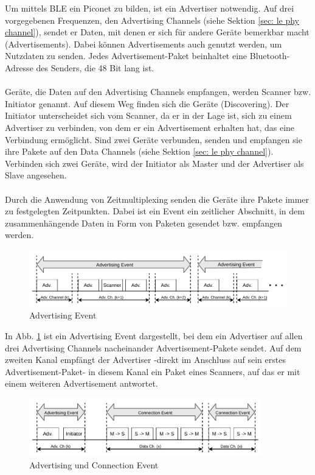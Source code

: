 Um mittels BLE ein Piconet zu bilden, ist ein Advertiser notwendig. Auf drei vorgegebenen Frequenzen, den Advertising Channels (siehe Sektion \ref{sec: le phy channel}), sendet er Daten, mit denen er sich für andere Geräte bemerkbar macht (Advertisements). Dabei können Advertisements auch genutzt werden, um Nutzdaten zu senden. Jedes Advertisement-Paket beinhaltet eine Bluetooth-Adresse des Senders, die 48 Bit lang ist.
\\\\
Geräte, die Daten auf den Advertising Channels empfangen, werden Scanner bzw. Initiator genannt. Auf diesem Weg finden sich die Geräte (Discovering). Der Initiator unterscheidet sich vom Scanner, da er in der Lage ist, sich zu einem Advertiser zu verbinden, von dem er ein Advertisement erhalten hat, das eine Verbindung ermöglicht. Sind zwei Geräte verbunden, senden und empfangen sie ihre Pakete auf den Data Channels (siehe Sektion \ref{sec: le phy channel}). Verbinden sich zwei Geräte, wird der Initiator als Master und der Advertiser als Slave angesehen.
\\\\
Durch die Anwendung von Zeitmultiplexing senden die Geräte ihre Pakete immer zu festgelegten Zeitpunkten. Dabei ist ein Event ein zeitlicher Abschnitt, in dem zusammenhängende Daten in Form von Paketen gesendet bzw. empfangen werden.

\begin{figure}[H]
    \centering
    \includegraphics[width=\textwidth]{graphics/advertising_event.pdf}
    \caption[Advertising Event]{Advertising Event \cite{BtSpec4.0_127}}
    \label{fig: adv event}
\end{figure}

In Abb. \ref{fig: adv event} ist ein Advertising Event dargestellt, bei dem ein Advertiser auf allen drei Advertising Channels nacheinander Advertisement-Pakete sendet. Auf dem zweiten Kanal empfängt der Advertiser -direkt im Anschluss auf sein erstes Advertisement-Paket- in diesem Kanal ein Paket eines Scanners, auf das er mit einem weiteren Advertisement antwortet.

\begin{figure}[H]
    \centering
    \includegraphics[width=0.9\textwidth]{graphics/advertising_initiator_event.pdf}
    \caption[Advertising und Connection Event]{Advertising und Connection Event \cite{BtSpec4.0_127}}
    \label{fig: adv init}
\end{figure}

